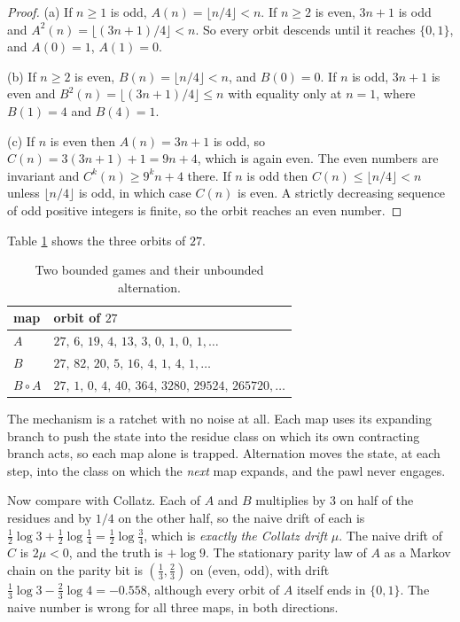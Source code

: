 \begin{proof}
(a) If $n\ge 1$ is odd, $A(n)=\lfloor n/4\rfloor<n$. If $n\ge 2$ is even, $3n+1$ is odd and $A^2(n)=\lfloor(3n+1)/4\rfloor<n$. So every orbit descends until it reaches $\{0,1\}$, and $A(0)=1$, $A(1)=0$.

(b) If $n\ge 2$ is even, $B(n)=\lfloor n/4\rfloor<n$, and $B(0)=0$. If $n$ is odd, $3n+1$ is even and $B^2(n)=\lfloor(3n+1)/4\rfloor\le n$ with equality only at $n=1$, where $B(1)=4$ and $B(4)=1$.

(c) If $n$ is even then $A(n)=3n+1$ is odd, so $C(n)=3(3n+1)+1=9n+4$, which is again even. The even numbers are invariant and $C^k(n)\ge 9^k n+4$ there. If $n$ is odd then $C(n)\le\lfloor n/4\rfloor<n$ unless $\lfloor n/4 \rfloor$ is odd, in which case $C(n)$ is even. A strictly decreasing sequence of odd positive integers is finite, so the orbit reaches an even number.
\end{proof}

Table \ref{rrt:tab:parrondo} shows the three orbits of $27$.

\begin{table}[t]
\centering
\small
\begin{tabular}{ll}
\toprule
map & orbit of $27$\\
\midrule
$A$ & $27,\,6,\,19,\,4,\,13,\,3,\,0,\,1,\,0,\,1,\dots$\\
$B$ & $27,\,82,\,20,\,5,\,16,\,4,\,1,\,4,\,1,\dots$\\
$B\circ A$ & $27,\,1,\,0,\,4,\,40,\,364,\,3280,\,29524,\,265720,\dots$\\
\bottomrule
\end{tabular}
\caption{Two bounded games and their unbounded alternation.}
\label{rrt:tab:parrondo}
\end{table}

The mechanism is a ratchet with no noise at all. Each map uses its expanding branch to push the state into the residue class on which its own contracting branch acts, so each map alone is trapped. Alternation moves the state, at each step, into the class on which the \emph{next} map expands, and the pawl never engages.

Now compare with Collatz. Each of $A$ and $B$ multiplies by $3$ on half of the residues and by $1/4$ on the other half, so the naive drift of each is $\tfrac12\log 3+\tfrac12\log\tfrac14=\tfrac12\log\tfrac34$, which is \emph{exactly the Collatz drift} $\mu$. The naive drift of $C$ is $2\mu<0$, and the truth is $+\log 9$. The stationary parity law of $A$ as a Markov chain on the parity bit is $(\tfrac13,\tfrac23)$ on (even, odd), with drift $\tfrac13\log 3-\tfrac23\log 4=-0.558$, although every orbit of $A$ itself ends in $\{0,1\}$. The naive number is wrong for all three maps, in both directions.

